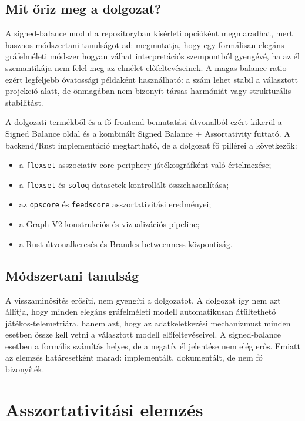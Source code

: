 ﻿\documentclass[a4paper,12pt]{report}
\begin{document}
\section{Mit őriz meg a dolgozat?}

A signed-balance modul a repositoryban kísérleti opcióként megmaradhat, mert hasznos módszertani tanulságot ad: megmutatja, hogy egy formálisan elegáns gráfelméleti módszer hogyan válhat interpretációs szempontból gyengévé, ha az él szemantikája nem felel meg az elmélet előfeltevéseinek. A magas balance-ratio ezért legfeljebb óvatossági példaként használható: a szám lehet stabil a választott projekció alatt, de önmagában nem bizonyít társas harmóniát vagy strukturális stabilitást.

A dolgozati termékből és a fő frontend bemutatási útvonalból ezért kikerül a Signed Balance oldal és a kombinált Signed Balance + Assortativity futtató. A backend/Rust implementáció megtartható, de a dolgozat fő pillérei a következők:

\begin{itemize}
    \item a \texttt{flexset} asszociatív core-periphery játékosgráfként való értelmezése;
    \item a \texttt{flexset} és \texttt{soloq} datasetek kontrollált összehasonlítása;
    \item az \texttt{opscore} és \texttt{feedscore} asszortativitási eredményei;
    \item a Graph V2 konstrukciós és vizualizációs pipeline;
    \item a Rust útvonalkeresés és Brandes-betweenness központiság.
\end{itemize}

\section{Módszertani tanulság}

A visszaminősítés erősíti, nem gyengíti a dolgozatot. A dolgozat így nem azt állítja, hogy minden elegáns gráfelméleti modell automatikusan átültethető játékos-telemetriára, hanem azt, hogy az adatkeletkezési mechanizmust minden esetben össze kell vetni a választott modell előfeltevéseivel. A signed-balance esetben a formális számítás helyes, de a negatív él jelentése nem elég erős. Emiatt az elemzés határesetként marad: implementált, dokumentált, de nem fő bizonyíték.

\chapter{Asszortativitási elemzés}
\end{document}
